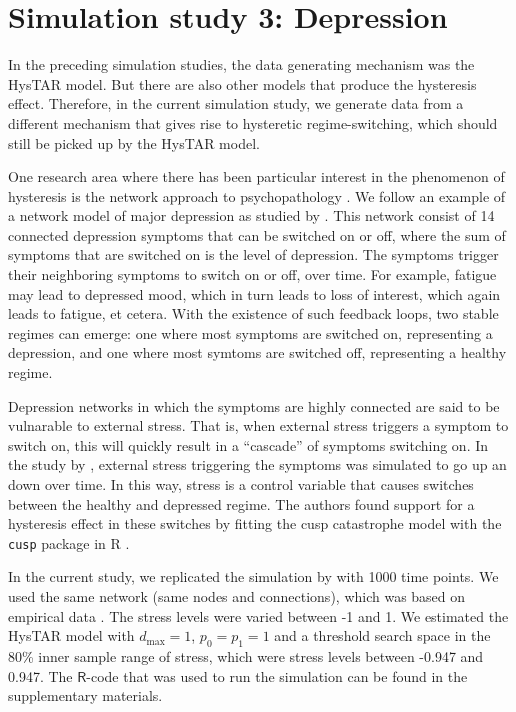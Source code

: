 \documentclass{article}
\begin{document}
\section{Simulation study 3: Depression} 
\label{sec:simulation_study_3}
In the preceding simulation studies, the data generating mechanism was the HysTAR model. 
But there are also other models that produce the hysteresis effect.
Therefore, in the current simulation study, we generate data from a different mechanism that gives rise to hysteretic regime-switching, which should still be picked up by the HysTAR model.

One research area where there has been particular interest in the phenomenon of hysteresis is the network approach to psychopathology \citep{borsboom_psychometric_2008}.
We follow an example of a network model of major depression as studied by \citet{cramer_major_2016}.
This network consist of 14 connected depression symptoms that can be switched on or off, where the sum of symptoms that are switched on is the level of depression.
The symptoms trigger their neighboring symptoms to switch on or off, over time. For example, fatigue may lead to depressed mood, which in turn leads to loss of interest, which again leads to fatigue, et cetera.
With the existence of such feedback loops, two stable regimes can emerge: one where most symptoms are switched on, representing a depression, and one where most symtoms are switched off, representing a healthy regime.

Depression networks in which the symptoms are highly connected are said to be vulnarable to external stress.
That is, when external stress triggers a symptom to switch on, this will  quickly result in a ``cascade'' of symptoms switching on.
In the study by \citet{cramer_major_2016}, external stress triggering the symptoms was simulated to go up an down over time.
In this way, stress is a control variable that causes switches between the healthy and depressed regime.
The authors found support for a hysteresis effect in these switches by fitting the cusp catastrophe model with the \texttt{cusp} package in \textsf{R} \citep{R, R_cusp}.

In the current study, we replicated the simulation by \citet{cramer_major_2016} with 1000 time points. 
We used the same network (same nodes and connections), which was based on empirical data \citep{network_data}. 
The stress levels were varied between -1 and 1. 
We estimated the HysTAR model with $d_{\max} = 1$, $p_0 = p_1 = 1$  and a threshold search space in the 80\% inner sample range of stress, which were stress levels between -0.947 and 0.947.
The $\mathsf{R}$-code that was used to run the simulation can be found in the supplementary materials.
\end{document}
